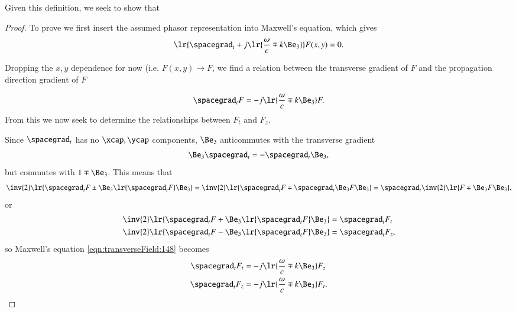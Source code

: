 Given this definition, we seek to show that

\begin{proof}
To prove we first insert the assumed phasor representation into Maxwell's equation, which gives
\begin{equation}\label{eqn:transverseField:summaryMax2}
\lr{\spacegrad_t + j \lr{ \frac{\omega}{c} \mp k \Be_3 } } F(x,y) = 0.
\end{equation}

Dropping the \( x, y \) dependence for now (i.e.  \( F(x, y) \rightarrow F \), we find a relation between the transverse gradient of \( F \) and the propagation direction gradient of \( F \)

\begin{dmath}\label{eqn:transverseField:148}
\spacegrad_t F = - j \lr{ \frac{\omega}{c} \mp k \Be_3 } F.
\end{dmath}
From this we now seek to determine the relationships between \( F_t \) and \( F_z \).

Since \( \spacegrad_t \) has no \( \xcap, \ycap \) components, \( \Be_3 \) anticommutes with the transverse gradient
\begin{dmath}\label{eqn:transverseField:168}
\Be_3 \spacegrad_t = - \spacegrad_t \Be_3,
\end{dmath}
but commutes with \( 1 \mp \Be_3 \).
This means that
\begin{dmath}\label{eqn:transverseField:188}
\inv{2} \lr{ \spacegrad_t F \pm \Be_3 \lr{ \spacegrad_t F } \Be_3 }
=
\inv{2} \lr{ \spacegrad_t F \mp \spacegrad_t \Be_3 F \Be_3 }
=
\spacegrad_t
\inv{2} \lr{ F \mp \Be_3 F \Be_3 },
\end{dmath}
or
\begin{dmath}\label{eqn:transverseField:208}
\begin{aligned}
\inv{2} \lr{ \spacegrad_t F + \Be_3 \lr{ \spacegrad_t F } \Be_3 } &= \spacegrad_t F_t \\
\inv{2} \lr{ \spacegrad_t F - \Be_3 \lr{ \spacegrad_t F } \Be_3 } &= \spacegrad_t F_z,
\end{aligned}
\end{dmath}
so Maxwell's equation \cref{eqn:transverseField:148} becomes
\begin{dmath}\label{eqn:transverseField:228}
\begin{aligned}
\spacegrad_t F_t &= - j \lr{ \frac{\omega}{c} \mp k \Be_3 } F_z \\
\spacegrad_t F_z &= - j \lr{ \frac{\omega}{c} \mp k \Be_3 } F_t.
\end{aligned}
\end{dmath}


\end{proof}

